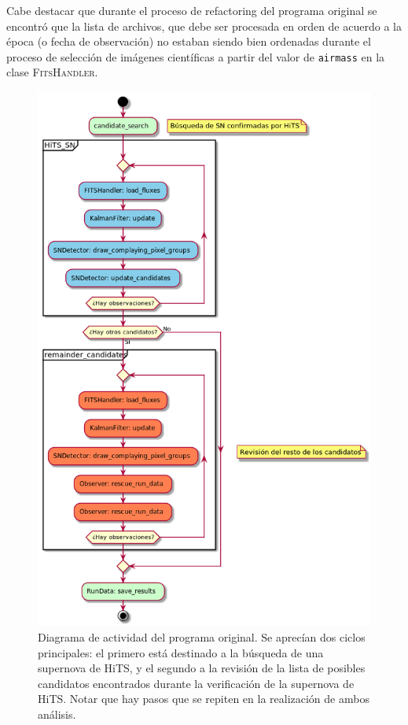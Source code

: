Cabe destacar que durante el proceso de refactoring del programa original se encontr\'o que la lista de archivos, que debe ser procesada en orden de acuerdo a la \'epoca (o fecha de observaci\'on) no estaban siendo bien ordenadas durante el proceso de selecci\'on de im\'agenes cient\'ificas a partir del valor de \texttt{airmass} en la clase \textsc{FitsHandler}.
\bigskip


\begin{figure}[h!]
\centering
\includegraphics[scale=.5]{images/results/sif_act}
\caption{Diagrama de actividad del programa original. Se aprec\'ian dos ciclos principales: el primero est\'a destinado a la b\'usqueda de una supernova de HiTS, y el segundo a la revisi\'on de la lista de posibles candidatos encontrados durante la verificaci\'on de la supernova de HiTS. Notar que hay pasos que se repiten en la realizaci\'on de ambos an\'alisis.}
\label{fig:des_sif}
\end{figure}

